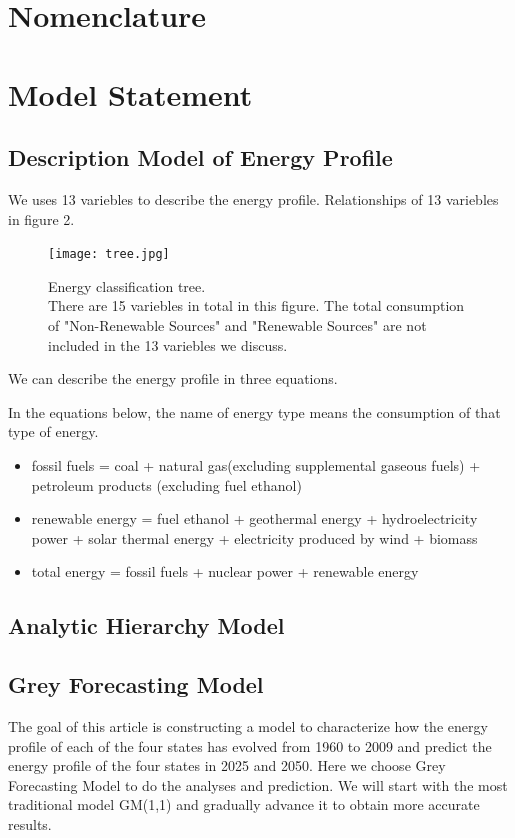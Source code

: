 \documentclass{mcmthesis}
\begin{document}
\section{Nomenclature}\label{Sec-Nomen}

\section{Model Statement} \label{Sec-Model}
%
\subsection{Description Model of Energy Profile}
We uses 13 variebles to describe the energy profile. Relationships of 13 variebles in figure 2.\\
\begin{figure}[htbp]
    \centering
    \texttt{[image: tree.jpg]}
    \caption{Energy classification tree.\\There are 15 variebles in total in this figure. The total consumption of "Non-Renewable Sources" and "Renewable Sources" are not included in the 13 variebles we discuss.}
\end{figure}
We can describe the energy profile in three equations.

In the equations below, the name of energy type means the consumption of that type of energy.

\begin{itemize}
\item fossil fuels = coal + natural gas(excluding supplemental gaseous fuels) + petroleum products  (excluding fuel ethanol)
\item renewable energy = fuel ethanol + geothermal energy + hydroelectricity power + solar thermal energy + electricity produced by wind + biomass
\item total energy = fossil fuels + nuclear power + renewable energy
\end{itemize} 

\subsection{Analytic Hierarchy Model}

\subsection{Grey Forecasting Model}
The goal of this article is constructing a model to characterize how the energy profile of each of the four states has evolved from 1960 to 2009 and predict the energy profile of the four states in 2025 and 2050. Here we choose Grey Forecasting Model to do the analyses and prediction. We will start with the most traditional model GM(1,1) and gradually advance it to obtain more accurate results.
\end{document}
